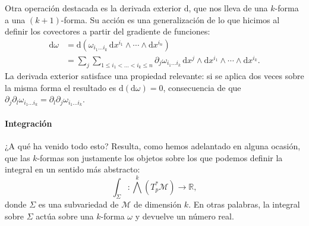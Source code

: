 Otra operación destacada es la derivada exterior \(\mathrm{d}\), que nos lleva de una \(k\)-forma a una \((k+1)\)-forma. Su acción es una generalización de lo que hicimos al definir los covectores a partir del gradiente de funciones:
\begin{align}
    \nonumber
    \mathrm{d}\omega &= \mathrm{d}\left(\omega_{i_1...i_k}\,\mathrm{d}x^{i_1}\wedge\cdots\wedge\mathrm{d}x^{i_n}\right)\\
    &= \sum_{j} \sum_{1\leq i_1<...<i_k\leq n} \partial_{j}\omega_{i_1...i_k}\,\mathrm{d}x^j\wedge\mathrm{d}x^{i_1}\wedge\cdots\wedge\mathrm{d}x^{i_k}.
\end{align}
La derivada exterior satisface una propiedad relevante: si se aplica dos veces sobre la misma forma el resultado es \(\mathrm{d}(\mathrm{d}\omega) = 0\), consecuencia de que \(\partial_{j}\partial_l\omega_{i_1...i_k} = \partial_{l}\partial_j\omega_{i_1...i_k}\).

\paragraph{Integración} ¿A qué ha venido todo esto? Resulta, como hemos adelantado en alguna ocasión, que las \(k\)-formas son justamente los objetos sobre los que podemos definir la integral en un sentido más abstracto:
\begin{equation}
    \int_\Sigma: \textstyle{\bigwedge^k}(T_p^*\mathcal{M}) \rightarrow \mathbb{R},
\end{equation}
donde \(\Sigma\) es una subvariedad de \(\mathcal{M}\) de dimensión \(k\). En otras palabras, la integral sobre \(\Sigma\) actúa sobre una \(k\)-forma \(\omega\) y devuelve un número real.


